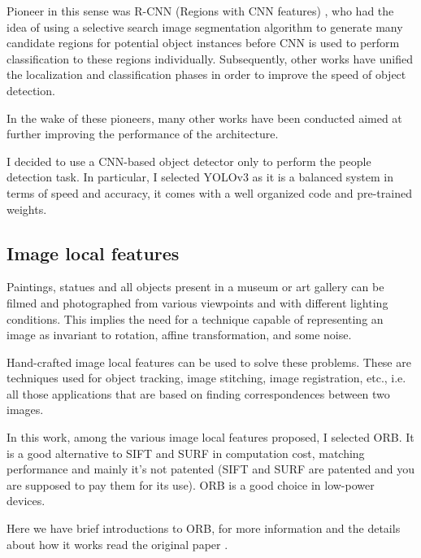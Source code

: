 \documentclass[10pt,twocolumn,letterpaper]{article}
\begin{document}
Pioneer in this sense was R-CNN (Regions with CNN features) \cite{girshick2014rich}, who had the idea of ​​using a selective search \cite{uijlings2013selective} image segmentation algorithm to generate many candidate regions for potential object instances before CNN is used to perform classification to these regions individually. Subsequently, other \cite{girshick2015fast, ren2015faster} works have unified the localization and classification phases in order to improve the speed of object detection.

In the wake of these pioneers, many other works have been conducted \cite{dai2016r, kim2016pvanet, lin2017feature, liu2016ssd, redmon2017yolo9000, redmon2016you, shrivastava2016training, redmon2018yolov3} aimed at further improving the performance of the architecture.

I decided to use a CNN-based object detector only to perform the people detection task. In particular, I selected YOLOv3 as it is a balanced system in terms of speed and accuracy, it comes with a well organized code and pre-trained weights.


\subsection{Image local features}
Paintings, statues and all objects present in a museum or art gallery can be filmed and photographed from various viewpoints and with different lighting conditions. This implies the need for a technique capable of representing an image as invariant to rotation, affine transformation, and some noise.

Hand-crafted image local features \cite{rublee2011orb,alahi2012freak,bay2006surf,jain2000statistical,leutenegger2011brisk,lowe2004distinctive,morel2009asift} can be used to solve these problems. These are techniques used for object tracking, image stitching, image registration, etc., i.e. all those applications that are based on finding correspondences between two images.

In this work, among the various image local features proposed, I selected ORB. It is a good alternative to SIFT and SURF in computation cost, matching performance and mainly it's not patented (SIFT and SURF are patented and you are supposed to pay them for its use). ORB is a good choice in low-power devices.

Here we have brief introductions to ORB, for more information and the details about how it works read the original paper \cite{rublee2011orb}.
\end{document}
